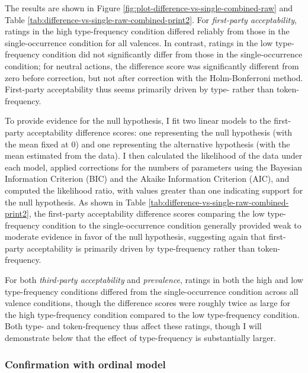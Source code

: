 \documentclass[
]{article}
\begin{document}
The results are shown in Figure \ref{fig:plot-difference-vs-single-combined-raw} and Table \ref{tab:difference-vs-single-raw-combined-print2}. For \emph{first-party acceptability}, ratings in the high type-frequency condition differed reliably from those in the single-occurrence condition for all valences. In contrast, ratings in the low type-frequency condition did not significantly differ from those in the single-occurrence condition; for neutral actions, the difference score was significantly different from zero before correction, but not after correction with the Holm-Bonferroni method. First-party acceptability thus seems primarily driven by type- rather than token-frequency.

To provide evidence for the null hypothesis, I fit two linear models to the first-party acceptability difference scores: one representing the null hypothesis (with the mean fixed at 0) and one representing the alternative hypothesis (with the mean estimated from the data). I then calculated the likelihood of the data under each model, applied corrections for the numbers of parameters using the Bayesian Information Criterion (BIC) and the Akaike Information Criterion (AIC), and computed the likelihood ratio, with values greater than one indicating support for the null hypothesis. As shown in Table \ref{tab:difference-vs-single-raw-combined-print2}, the first-party acceptability difference scores comparing the low type-frequency condition to the single-occurrence condition generally provided weak to moderate evidence in favor of the null hypothesis, suggesting again that first-party acceptability is primarily driven by type-frequency rather than token-frequency.

For both \emph{third-party acceptability} and \emph{prevalence}, ratings in both the high and low type-frequency conditions differed from the single-occurrence condition across all valence conditions, though the difference scores were roughly twice as large for the high type-frequency condition compared to the low type-frequency condition. Both type- and token-frequency thus affect these ratings, though I will demonstrate below that the effect of type-frequency is substantially larger.

\clearpage

\subsubsection{Confirmation with ordinal model}\label{confirmation-with-ordinal-model-2}
\end{document}
